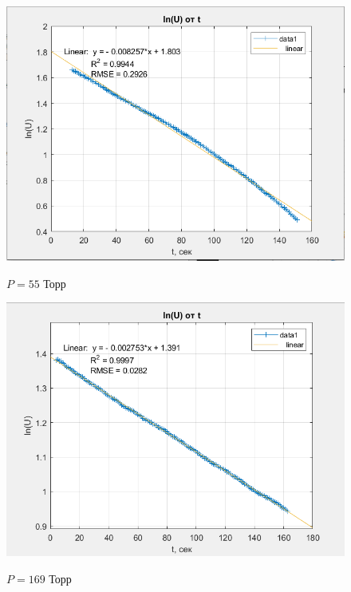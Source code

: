 \documentclass[a4paper, 12pt]{article} %
\begin{document}
\begin{figure}[h]
    \centering
    \includegraphics[width = 10.5 cm]{2gr55}
    \label{fig:vac}
    
    \begin{center}
        \caption{$P = 55$ Торр}
    \end{center}
\end{figure} 

\begin{figure}[h]
    \centering
    \includegraphics[width = 10.5 cm]{2gr169}
    \label{fig:vac}
    
    \begin{center}
        \caption{$P = 169$ Торр}
    \end{center}
\end{figure} 
\end{document}
